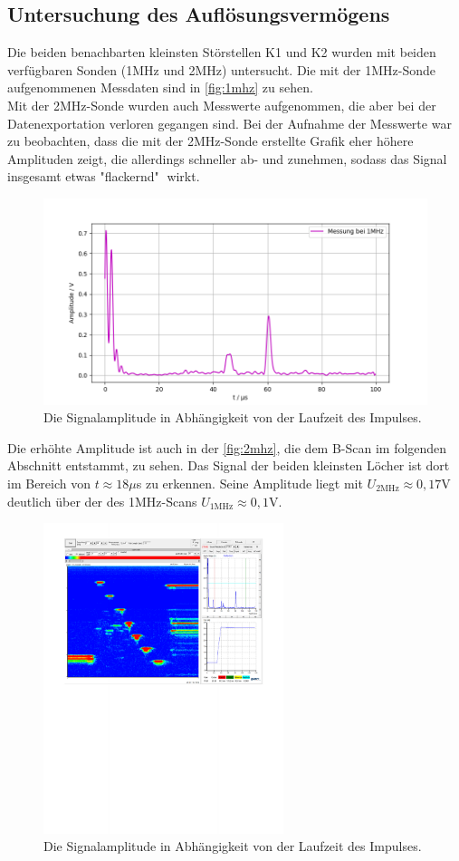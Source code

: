 \subsection{Untersuchung des Auflösungsvermögens}
Die beiden benachbarten kleinsten Störstellen K1 und K2 wurden mit beiden verfügbaren
Sonden (1MHz und 2MHz) untersucht. Die mit der 1MHz-Sonde aufgenommenen Messdaten sind in \autoref{fig:1mhz} zu sehen.\\
Mit der 2MHz-Sonde wurden auch Messwerte aufgenommen, die aber bei der Datenexportation verloren gegangen sind. 
Bei der Aufnahme der Messwerte war zu beobachten, dass die mit der 2MHz-Sonde erstellte Grafik eher höhere 
Amplituden zeigt, die allerdings schneller ab- und zunehmen, sodass das Signal insgesamt etwas "flackernd"  $\; $wirkt.
\begin{figure}[H]
  \centering
  \includegraphics[width = \textwidth]{content/1mhz_aufl_plot.png}
  \caption{Die Signalamplitude in Abhängigkeit von der Laufzeit des Impulses.}
  \label{fig:1mhz}
\end{figure}
Die erhöhte Amplitude ist auch in der \autoref{fig:2mhz}, die dem B-Scan im folgenden Abschnitt entstammt, zu sehen. Das Signal der beiden kleinsten Löcher 
ist dort im Bereich von $t \approx 18\mu$s zu erkennen. 
Seine Amplitude liegt mit $U_{\mathrm{2MHz}} \approx 0,17$V deutlich über der des 1MHz-Scans $U_{\mathrm{1MHz}} \approx 0,1$V.



\begin{figure}[H]
  \centering
  \includegraphics[width = 7cm]{content/2Mhz.pdf}
  \caption{Die Signalamplitude in Abhängigkeit von der Laufzeit des Impulses.}
  \label{fig:2mhz}
\end{figure}


